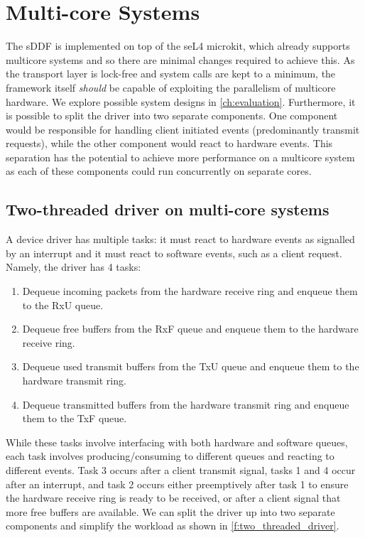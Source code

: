 \section{Multi-core Systems}\label{s:multicore}

The sDDF is implemented on top of the seL4 microkit, which already supports multicore systems
and so there are minimal changes required
to achieve this. As the transport layer is lock-free and system calls are kept to a minimum, the framework itself 
\emph{should} be capable of exploiting the parallelism of multicore hardware. We explore possible system designs in \autoref{ch:evaluation}.
Furthermore, it is possible to split the driver into two separate components. One component would be responsible for
handling client initiated events (predominantly transmit requests), while the other component would react to 
hardware events. This separation has the potential to achieve more performance on a multicore system as
each of these components could run concurrently on separate cores.\\

\subsection{Two-threaded driver on multi-core systems}
A device driver has multiple tasks: it must react to hardware events as signalled by an interrupt and it must react to software events,
such as a client request. Namely, the driver has 4 tasks:

\begin{enumerate}
    \item Dequeue incoming packets from the hardware receive ring and enqueue them to the RxU queue.
    \item Dequeue free buffers from the RxF queue and enqueue them to the hardware receive ring.
    \item Dequeue used transmit buffers from the TxU queue and enqueue them to the hardware transmit ring.
    \item Dequeue transmitted buffers from the hardware transmit ring and enqueue them to the TxF queue. 
\end{enumerate}

While these tasks involve interfacing with both hardware and software queues, each task involves
producing/consuming to different queues and reacting to different events. Task 3 occurs after a client transmit signal, 
tasks 1 and 4 occur after an interrupt, and task 2 occurs either preemptively after task 1 to ensure the hardware receive
ring is ready to be received, or after a client signal that more free buffers are available. We can split the driver up into
two separate components and simplify the workload as shown in \autoref{f:two_threaded_driver}.

